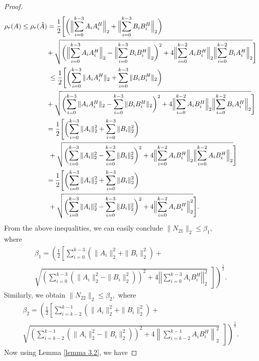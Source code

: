 \documentclass[10pt,a4paper]{amsart}
\begin{document}
\begin{proof}
\begin{align*}
\rho_{r}(A) &\le \rho_{r}(\tilde{A}) 
= \frac{1}{2}\Biggl[ \biggl( \Bigl\|\sum_{i=0}^{k-3} A_i A_i^{H}\Bigr\|_2 + \Bigl\|\sum_{i=0}^{k-3} B_i B_i^{H}\Bigr\|_2 \biggr) \\
&~~~~~\qquad + \sqrt{ \biggl( \Bigl\|\sum_{i=0}^{k-3} A_i A_i^{H}\Bigr\|_2 - \Bigl\|\sum_{i=0}^{k-3} B_i B_i^{H}\Bigr\|_2 \biggr)^2 + 4\Bigl\|\sum_{i=0}^{k-2} A_i B_i^{H}\Bigr\|_2 \Bigl\|\sum_{i=0}^{k-2} B_i A_i^{H}\Bigr\|_2 } \Biggr] \\
&~~~~~~~~~~~~\le \frac{1}{2}\Biggl[ \biggl( \sum_{i=0}^{k-3} \|A_i A_i^{H}\|_2 + \sum_{i=0}^{k-3} \|B_i B_i^{H}\|_2 \biggr) \\
&~~~~~\qquad + \sqrt{ \biggl( \sum_{i=0}^{k-3} \|A_i A_i^{H}\|_2 - \sum_{i=0}^{k-3} \|B_i B_i^{H}\|_2 \biggr)^2 + 4\Bigl\|\sum_{i=0}^{k-2} A_i B_i^{H}\Bigr\|_2 \Bigl\|\sum_{i=0}^{k-2} B_i A_i^{H}\Bigr\|_2 } \Biggr] \\
&~~~~~~~~~~~= \frac{1}{2}\Biggl[ \biggl( \sum_{i=0}^{k-3} \|A_i\|_2^2 + \sum_{i=0}^{k-3} \|B_i\|_2^2 \biggr) \\
&~~~~~~\qquad + \sqrt{ \biggl( \sum_{i=0}^{k-3} \|A_i\|_2^2 - \sum_{i=0}^{k-3} \|B_i\|_2^2 \biggr)^2 + 4\Bigl\|\sum_{i=0}^{k-2} A_i B_i^{H}\Bigr\|_2 \Bigl\|\sum_{i=0}^{k-2} A_i B_i^{H}\Bigr\|_2 } \Biggr] \\
&~~~~~~~~~~~= \frac{1}{2}\Biggl[ \biggl( \sum_{i=0}^{k-3} \|A_i\|_2^2 + \sum_{i=0}^{k-3} \|B_i\|_2^2 \biggr) \\
&~~~~~~\qquad + \sqrt{ \biggl( \sum_{i=0}^{k-3} \|A_i\|_2^2 - \sum_{i=0}^{k-3} \|B_i\|_2^2 \biggr)^2 + 4\Bigl\|\sum_{i=0}^{k-2} A_i B_i^{H}\Bigr\|_2^2 } \Biggr].
\end{align*}
 From the above inequalities, we can easily conclude 
     $\|N_{21}\|_{2}\le \beta_{1},$ \\
where  \begin{multline*}
 \beta_{1}=\left( \frac{1}{2} \left[ \sum_{i=0}^{k-3}\left(\|A_{i}\|^{2}_{2}+\|B_{i}\|_{2}^{2}\right)+ \right. \right. \\
\left. \left.\sqrt{ \left( \sum_{i=0}^{k-3}\left(\|A_{i}\|^{2}_{2}-\|B_{i}\|_{2}^{2} \right)     \right)^{2}            +4\left|\left|\sum_{i=0}^{k-3}A_{i}{B_{i}^{H}}\right|\right|_{2}^{2} }~~\right]  \right)^{\frac{1}{2}}.
\end{multline*}
Similarly, we obtain $\|N_{22}\|_{2}\le \beta_{2},$ where
\begin{multline*} 
\beta_{2}=\left( \frac{1}{2} \left[ \sum_{i=k-2}^{k-1}\left(\|A_{i}\|^{2}_{2}+\|B_{i}\|_{2}^{2}\right)+ \right. \right. \\
\left. \left. \sqrt{ \left( \sum_{i=k-2}^{k-1}\left(\|A_{i}\|^{2}_{2}-\|B_{i}\|_{2}^{2} \right) \right)^{2} +4\left\|\sum_{i=k-2}^{k-1}A_{i}{B_{i}^{H}}\right\|_{2}^{2} }~~\right] \right)^{\frac{1}{2}}. 
\end{multline*}
Now using Lemma {\ref{lemma 3.2}}, we have 


\end{proof}
\end{document}
